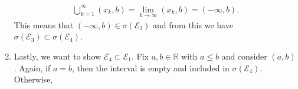 \begin{solution}
\begin{enumerate}
    \begin{align}
        \bigcup_{k=1}^\infty (x_k, b) = \lim_{k \rightarrow \infty} (x_k, b) = (-\infty, b) \text{.}
    \end{align}
    This means that \((-\infty, b) \in \sigma (\mathcal{E}_3)\) and from this we have \(\sigma (\mathcal{E}_3) \subset \sigma (\mathcal{E}_4)\).
    \item Lastly, we want to show \(\mathcal{E}_4 \subset \mathcal{E}_1\). Fix \(a, b \in \mathbb{R}\) with \(a \leq b\) and consider \((a, b)\). Again, if \(a = b\), then the interval is empty and included in \(\sigma (\mathcal{E}_4) \). Otherwise, 
    \end{enumerate}
\end{solution}